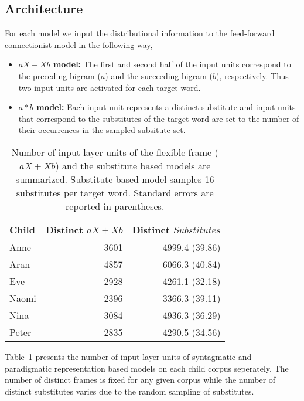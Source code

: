 \subsection{Architecture}
For each model we input the distributional information to the
feed-forward connectionist model in the following way,

\begin{itemize}
\item {\bf$aX+Xb$ model:} The first and second half of the input units
  correspond to the preceding bigram ($a$) and the succeeding bigram
  ($b$), respectively.  Thus two input units are activated for each
  target word.
\item {\bf $a*b$ model:} Each input unit represents a distinct
  substitute and input units that correspond to the substitutes of the
  target word are set to the number of their occurrences in the
  sampled subsitute set.
\end{itemize}

\begin{table}[ht]
\centering
\caption{
  Number of input layer units of the flexible frame ($aX + Xb$) and 
  the substitute based models are summarized.  Substitute based model
  samples 16 substitutes per target word. Standard errors are
  reported in parentheses.
}
\begin{tabular}{lrr}
  \hline  
  Child & \specialcell{Distinct\\$aX+Xb$} & \specialcell{Distinct \\ $Substitutes$}\\
  \hline
  Anne  & 3601 & 4999.4 (39.86)\\
  Aran  & 4857 & 6066.3 (40.84)\\
  Eve   & 2928 & 4261.1 (32.18)\\
  Naomi & 2396 & 3366.3 (39.11)\\
  Nina  & 3084 & 4936.3 (36.29)\\
  Peter & 2835 & 4290.5 (34.56)\\
  \hline
\end{tabular}
\label{t:inputunits}
\end{table}

Table~\ref{t:inputunits} presents the number of input layer units of
syntagmatic and paradigmatic representation based models on each child
corpus seperately.  The number of distinct frames is fixed for any
given corpus while the number of distinct substitutes varies due to
the random sampling of substitutes.

